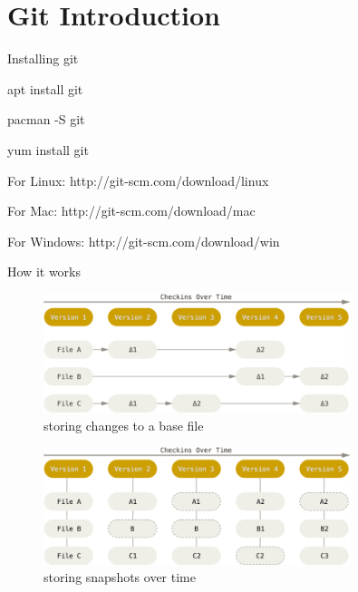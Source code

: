 \section{Git Introduction}

\begin{frame}{Installing git}

    apt install git

    pacman -S git

    yum install git

    \begin{description}
        \item{For Linux:} http://git-scm.com/download/linux
        \item{For Mac:} http://git-scm.com/download/mac
        \item{For Windows:} http://git-scm.com/download/win
    \end{description}

\end{frame}

\begin{frame}[fragile]{How it works}
    \begin{minipage}{\textwidth}
        \begin{figure}
            \centering
            \includegraphics[width=0.8\textwidth]{img/filebased.png}
            \caption{storing changes to a base file}
        \end{figure}
    \end{minipage}
    \begin{minipage}{\textwidth}
        \begin{figure}
            \centering
            \includegraphics[width=0.8\textwidth]{img/snapshotbased.png}
            \caption{storing snapshots over time}
        \end{figure}
    \end{minipage}
\end{frame}


